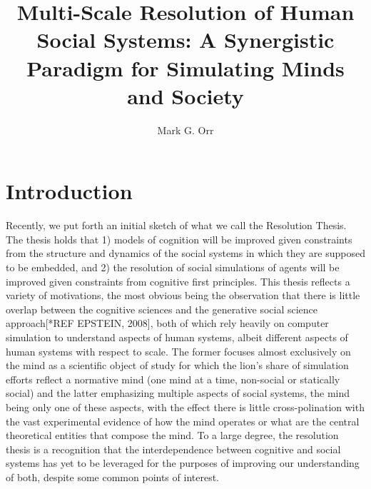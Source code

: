 \documentclass{article}
\title{Multi-Scale Resolution of Human Social Systems:  A Synergistic Paradigm for Simulating Minds and Society}
\author{Mark G. Orr}
\begin{document}
\maketitle

\section{Introduction}
Recently, we put forth an initial sketch of what we call the Resolution Thesis.  The thesis holds that 1) models of cognition will be improved given constraints from the structure and dynamics of the social systems in which they are supposed to be embedded, and 2) the resolution of social simulations of agents will be improved given constraints from cognitive first principles.  This thesis reflects a variety of motivations, the most obvious being the observation that there is little overlap between the cognitive sciences and the generative social science approach[*REF EPSTEIN, 2008], both of which rely heavily on computer simulation to understand aspects of human systems, albeit different aspects of human systems with respect to scale.  The former focuses almost exclusively on the mind as a scientific object of study for which the lion's share of simulation efforts reflect a normative mind (one mind at a time, non-social or statically social) and the latter emphasizing multiple aspects of social systems, the mind being only one of these aspects, with the effect there is little cross-polination with the vast experimental evidence of how the mind operates or what are the central theoretical entities that compose the mind.  To a large degree, the resolution thesis is a recognition that the interdependence between cognitive and social systems has yet to be leveraged for the purposes of improving our understanding of both, despite some common points of interest.    
\end{document}
